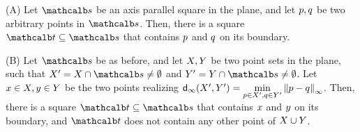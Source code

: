 \documentclass[12pt]{article}%
\begin{document}
\begin{lemma}
    (A) Let $\sqr$ be an axis parallel square in the plane, and let
    $p, q$ be two arbitrary points in $\sqr$. Then, there is a
    square $\sqrA \subseteq \sqr$ that contains $p$ and $q$ on its
    boundary.

    (B) Let $\sqr$ be as before, and let $X, Y$ be two point sets in the plane, such that
    $\PSX' = \PSX \cap \sqr \neq \emptyset$ and
    $\PSY' = \PSY \cap \sqr \neq \emptyset$. Let
    $x \in X, y \in Y$ be the two points realizing
    $\dsZ{\infty}{\PSX'}{\PSY'} = \underset{\pa \in \PSX', \pb \in \PSY'}{\min}
    \dZ{\infty}{\pa}{\pb}$. Then, there is a square
    $\sqrA \subseteq \sqr$ that contains $x$ and $y$ on its
    boundary, and $\sqrA$ does not contain any other point of
    $X \cup Y$.
\end{lemma}
\end{document}
